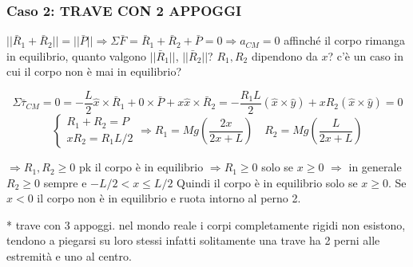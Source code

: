 \subsubsection*{Caso 2: TRAVE CON 2 APPOGGI}
$||\bar{R}_1 + \bar{R}_2|| = ||\bar{P}|| \Rightarrow \Sigma \bar{F} = \bar{R}_1 + \bar{R}_2 + \bar{P} = 0 \Rightarrow a_{CM} = 0$
affinché il corpo rimanga in equilibrio, quanto valgono $||\bar{R}_1||$, $||\bar{R}_2||$?
$R_1, R_2$ dipendono da $x$?
c'è un caso in cui il corpo non è mai in equilibrio?

\begin{figure}[H]
\raggedleft
{}
\end{figure}

$$ \Sigma \bar{\tau}_{CM} = 0 = -\frac{L}{2} \hat{x} \times \bar{R}_1 + 0 \times \bar{P} + x \hat{x} \times \bar{R}_2 = -\frac{R_1 L}{2} (\hat{x} \times \hat{y}) + x R_2 (\hat{x} \times \hat{y}) = 0 $$
$$ \begin{cases}
R_1 + R_2 = P \\
x R_2 = R_1 L/2
\end{cases} \Rightarrow R_1 = Mg \left( \frac{2x}{2x+L} \right) \quad R_2 = Mg \left( \frac{L}{2x+L} \right) $$

$\Rightarrow R_1, R_2 \ge 0$ pk il corpo è in equilibrio
$\Rightarrow R_1 \ge 0$ solo se $x \ge 0$
$\Rightarrow$ in generale $R_2 \ge 0$ sempre e $-L/2 < x \le L/2$
Quindi il corpo è in equilibrio solo se $x \ge 0$.
Se $x < 0$ il corpo non è in equilibrio e ruota intorno al perno 2.

* trave con 3 appoggi. nel mondo reale i corpi completamente rigidi non esistono, tendono a piegarsi su loro stessi infatti solitamente una trave ha 2 perni alle estremità e uno al centro.

